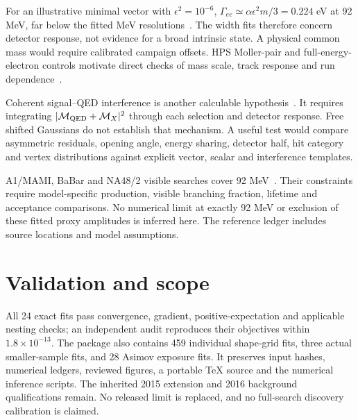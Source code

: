 \documentclass[11pt,letterpaper]{article}
\begin{document}
For an illustrative minimal vector with $\epsilon^2=10^{-6}$, $\Gamma_{ee}\simeq\alpha\epsilon^2m/3=0.224$ eV at 92 MeV, far below the fitted MeV resolutions~\cite{bjorken}. The width fits therefore concern detector response, not evidence for a broad intrinsic state. A physical common mass would require calibrated campaign offsets. HPS Moller-pair and full-energy-electron controls motivate direct checks of mass scale, track response and run dependence~\cite{hps}.

Coherent signal--QED interference is another calculable hypothesis~\cite{interference}. It requires integrating $|\mathcal M_{\rm QED}+\mathcal M_X|^2$ through each selection and detector response. Free shifted Gaussians do not establish that mechanism. A useful test would compare asymmetric residuals, opening angle, energy sharing, detector half, hit category and vertex distributions against explicit vector, scalar and interference templates.

A1/MAMI, BaBar and NA48/2 visible searches cover 92 MeV~\cite{a1,babar,na48}. Their constraints require model-specific production, visible branching fraction, lifetime and acceptance comparisons. No numerical limit at exactly 92 MeV or exclusion of these fitted proxy amplitudes is inferred here. The reference ledger includes source locations and model assumptions.

\section*{Validation and scope}
All 24 exact fits pass convergence, gradient, positive-expectation and applicable nesting checks; an independent audit reproduces their objectives within $1.8\times10^{-13}$. The package also contains 459 individual shape-grid fits, three actual smaller-sample fits, and 28 Asimov exposure fits. It preserves input hashes, numerical ledgers, reviewed figures, a portable TeX source and the numerical inference scripts. The inherited 2015 extension and 2016 background qualifications remain. No released limit is replaced, and no full-search discovery calibration is claimed.
\end{document}
